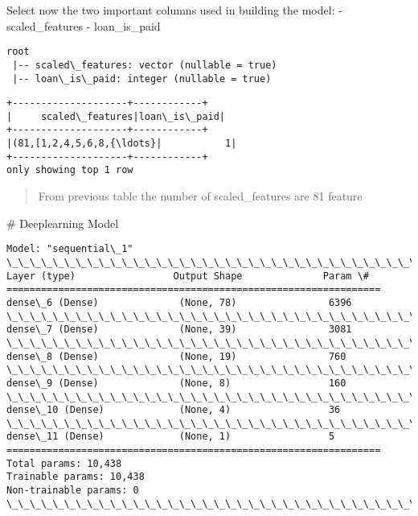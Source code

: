 \documentclass[11pt]{article}
\begin{document}
    Select now the two important columns used in building the model: -
scaled\_features - loan\_is\_paid

    \begin{Verbatim}[commandchars=\\\{\}]
root
 |-- scaled\_features: vector (nullable = true)
 |-- loan\_is\_paid: integer (nullable = true)

    \end{Verbatim}

    \begin{Verbatim}[commandchars=\\\{\}]
+--------------------+------------+
|     scaled\_features|loan\_is\_paid|
+--------------------+------------+
|(81,[1,2,4,5,6,8,{\ldots}|           1|
+--------------------+------------+
only showing top 1 row

    \end{Verbatim}

    \begin{quote}
From previous table the number of scaled\_features are 81 feature
\end{quote}

    \# Deeplearning Model

    \begin{Verbatim}[commandchars=\\\{\}]
Model: "sequential\_1"
\_\_\_\_\_\_\_\_\_\_\_\_\_\_\_\_\_\_\_\_\_\_\_\_\_\_\_\_\_\_\_\_\_\_\_\_\_\_\_\_\_\_\_\_\_\_\_\_\_\_\_\_\_\_\_\_\_\_\_\_\_\_\_\_\_
Layer (type)                 Output Shape              Param \#
=================================================================
dense\_6 (Dense)              (None, 78)                6396
\_\_\_\_\_\_\_\_\_\_\_\_\_\_\_\_\_\_\_\_\_\_\_\_\_\_\_\_\_\_\_\_\_\_\_\_\_\_\_\_\_\_\_\_\_\_\_\_\_\_\_\_\_\_\_\_\_\_\_\_\_\_\_\_\_
dense\_7 (Dense)              (None, 39)                3081
\_\_\_\_\_\_\_\_\_\_\_\_\_\_\_\_\_\_\_\_\_\_\_\_\_\_\_\_\_\_\_\_\_\_\_\_\_\_\_\_\_\_\_\_\_\_\_\_\_\_\_\_\_\_\_\_\_\_\_\_\_\_\_\_\_
dense\_8 (Dense)              (None, 19)                760
\_\_\_\_\_\_\_\_\_\_\_\_\_\_\_\_\_\_\_\_\_\_\_\_\_\_\_\_\_\_\_\_\_\_\_\_\_\_\_\_\_\_\_\_\_\_\_\_\_\_\_\_\_\_\_\_\_\_\_\_\_\_\_\_\_
dense\_9 (Dense)              (None, 8)                 160
\_\_\_\_\_\_\_\_\_\_\_\_\_\_\_\_\_\_\_\_\_\_\_\_\_\_\_\_\_\_\_\_\_\_\_\_\_\_\_\_\_\_\_\_\_\_\_\_\_\_\_\_\_\_\_\_\_\_\_\_\_\_\_\_\_
dense\_10 (Dense)             (None, 4)                 36
\_\_\_\_\_\_\_\_\_\_\_\_\_\_\_\_\_\_\_\_\_\_\_\_\_\_\_\_\_\_\_\_\_\_\_\_\_\_\_\_\_\_\_\_\_\_\_\_\_\_\_\_\_\_\_\_\_\_\_\_\_\_\_\_\_
dense\_11 (Dense)             (None, 1)                 5
=================================================================
Total params: 10,438
Trainable params: 10,438
Non-trainable params: 0
\_\_\_\_\_\_\_\_\_\_\_\_\_\_\_\_\_\_\_\_\_\_\_\_\_\_\_\_\_\_\_\_\_\_\_\_\_\_\_\_\_\_\_\_\_\_\_\_\_\_\_\_\_\_\_\_\_\_\_\_\_\_\_\_\_
    \end{Verbatim}
\end{document}
